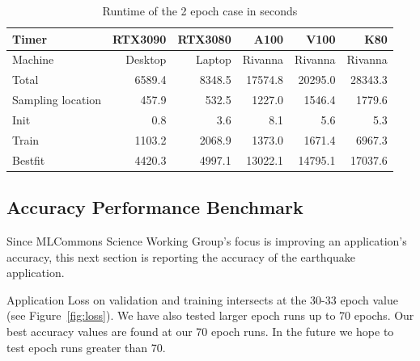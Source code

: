 \documentclass[utf8]{FrontiersinVancouver} %
\begin{document}
    
\begin{table}[htb]
    \caption{Runtime of the 2 epoch case in seconds}
    \label{tab:2-epoch-case}
    \begin{center}
    {\footnotesize              

          \begin{tabular}{lrrrrr}
            Timer             & RTX3090 & RTX3080 & A100    & V100    & K80     \\
            \hline
            Machine           & Desktop & Laptop  & Rivanna & Rivanna & Rivanna \\
            Total             & 6589.4  & 8348.5  & 17574.8 & 20295.0 & 28343.3 \\
            Sampling location &  457.9  &  532.5  &  1227.0 &  1546.4 &  1779.6 \\
            Init              &    0.8  &    3.6  &    8.1  &     5.6 &     5.3 \\
            Train             & 1103.2  & 2068.9  &  1373.0 &  1671.4 &  6967.3 \\
            Bestfit           & 4420.3  & 4997.1  & 13022.1 & 14795.1 & 17037.6 \\
            \hline
          \end{tabular}

    }
    \end{center}
\end{table}


\subsection{Accuracy Performance Benchmark}
\label{sec:perf-accuracy}



Since MLCommons Science Working Group's focus is improving an 
application’s accuracy, this next section is reporting the accuracy 
of the earthquake application.

Application Loss on validation and training intersects at the 30-33 
epoch value (see Figure~\ref{fig:loss}). We have also tested larger 
epoch runs up to 70 epochs. Our best accuracy values are found at our 
70 epoch runs. In the future we hope to test epoch runs greater than 70.
\end{document}
